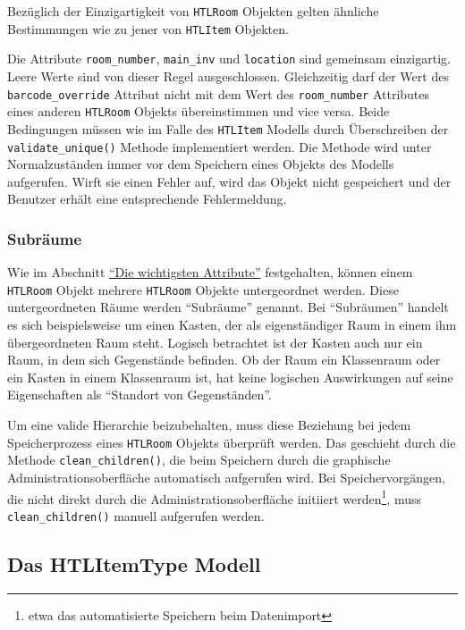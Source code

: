 Bezüglich der Einzigartigkeit von \texttt{HTLRoom} Objekten gelten
ähnliche Bestimmungen wie zu jener von \texttt{HTLItem} Objekten.

Die Attribute \texttt{room\_number}, \texttt{main\_inv} und
\texttt{location} sind gemeinsam einzigartig. Leere Werte sind von
dieser Regel ausgeschlossen. Gleichzeitig darf der Wert des
\texttt{barcode\_override} Attribut nicht mit dem Wert des
\texttt{room\_number} Attributes eines anderen \texttt{HTLRoom} Objekts
übereinstimmen und vice versa. Beide Bedingungen müssen wie im Falle des
\texttt{HTLItem} Modells durch Überschreiben der
\texttt{validate\_unique()} Methode \cite{django-doku-models-instances}
implementiert werden. Die Methode wird unter Normalzuständen immer vor
dem Speichern eines Objekts des Modells aufgerufen. Wirft sie einen
Fehler auf, wird das Objekt nicht gespeichert und der Benutzer erhält
eine entsprechende Fehlermeldung.

\hypertarget{subruxe4ume}{%
\subsubsection{Subräume}\label{subruxe4ume}}

Wie im Abschnitt \protect\hyperlink{die-wichtigsten-attribute-1}{``Die
wichtigsten Attribute''} festgehalten, können einem \texttt{HTLRoom}
Objekt mehrere \texttt{HTLRoom} Objekte untergeordnet werden. Diese
untergeordneten Räume werden ``Subräume'' genannt. Bei ``Subräumen''
handelt es sich beispielsweise um einen Kasten, der als eigenständiger
Raum in einem ihm übergeordneten Raum steht. Logisch betrachtet ist der
Kasten auch nur ein Raum, in dem sich Gegenstände befinden. Ob der Raum
ein Klassenraum oder ein Kasten in einem Klassenraum ist, hat keine
logischen Auswirkungen auf seine Eigenschaften als ``Standort von
Gegenständen''.

Um eine valide Hierarchie beizubehalten, muss diese Beziehung bei jedem
Speicherprozess eines \texttt{HTLRoom} Objekts überprüft werden. Das
geschieht durch die Methode \texttt{clean\_children()}, die beim
Speichern durch die graphische Administrationsoberfläche automatisch
aufgerufen wird. Bei Speichervorgängen, die nicht direkt durch die
Administrationsoberfläche initiiert werden\footnote{etwa das
  automatisierte Speichern beim Datenimport}, muss
\texttt{clean\_children()} manuell aufgerufen werden.

\hypertarget{das-htlitemtype-modell}{%
\subsection{Das HTLItemType Modell}\label{das-htlitemtype-modell}}

